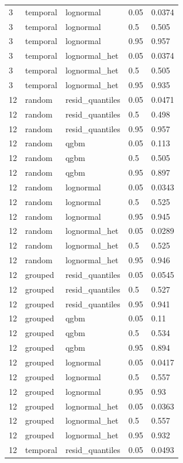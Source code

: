 \begin{tabular}{lllll}
3 & temporal & lognormal & 0.05 & 0.0374 \\
3 & temporal & lognormal & 0.5 & 0.505 \\
3 & temporal & lognormal & 0.95 & 0.957 \\
3 & temporal & lognormal\_het & 0.05 & 0.0374 \\
3 & temporal & lognormal\_het & 0.5 & 0.505 \\
3 & temporal & lognormal\_het & 0.95 & 0.935 \\
12 & random & resid\_quantiles & 0.05 & 0.0471 \\
12 & random & resid\_quantiles & 0.5 & 0.498 \\
12 & random & resid\_quantiles & 0.95 & 0.957 \\
12 & random & qgbm & 0.05 & 0.113 \\
12 & random & qgbm & 0.5 & 0.505 \\
12 & random & qgbm & 0.95 & 0.897 \\
12 & random & lognormal & 0.05 & 0.0343 \\
12 & random & lognormal & 0.5 & 0.525 \\
12 & random & lognormal & 0.95 & 0.945 \\
12 & random & lognormal\_het & 0.05 & 0.0289 \\
12 & random & lognormal\_het & 0.5 & 0.525 \\
12 & random & lognormal\_het & 0.95 & 0.946 \\
12 & grouped & resid\_quantiles & 0.05 & 0.0545 \\
12 & grouped & resid\_quantiles & 0.5 & 0.527 \\
12 & grouped & resid\_quantiles & 0.95 & 0.941 \\
12 & grouped & qgbm & 0.05 & 0.11 \\
12 & grouped & qgbm & 0.5 & 0.534 \\
12 & grouped & qgbm & 0.95 & 0.894 \\
12 & grouped & lognormal & 0.05 & 0.0417 \\
12 & grouped & lognormal & 0.5 & 0.557 \\
12 & grouped & lognormal & 0.95 & 0.93 \\
12 & grouped & lognormal\_het & 0.05 & 0.0363 \\
12 & grouped & lognormal\_het & 0.5 & 0.557 \\
12 & grouped & lognormal\_het & 0.95 & 0.932 \\
12 & temporal & resid\_quantiles & 0.05 & 0.0493 \\

\end{tabular}

